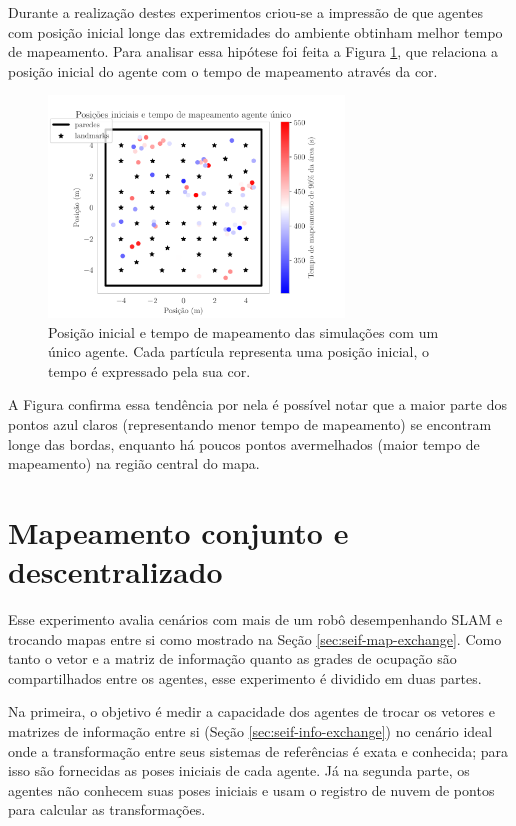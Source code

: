 Durante a realização destes experimentos criou-se a impressão de que agentes com posição inicial longe das extremidades do ambiente obtinham 
melhor tempo de mapeamento. Para analisar essa hipótese foi feita a Figura \ref{fig:single-agent-initial-pos-and-time}, que relaciona a 
posição inicial do agente com o tempo de mapeamento através da cor. 

\begin{figure}
  \centering
  \includegraphics[width=0.7\textwidth]{figs/single-agent/initial_positions_and_time_single_agent.pdf}
  \caption[Posição inicial e tempo de mapeamento das simulações com um único agente.]{Posição inicial e tempo de mapeamento das simulações com um único agente. Cada partícula representa uma posição inicial, o tempo é expressado pela sua cor.}
  \label{fig:single-agent-initial-pos-and-time}
\end{figure}
A Figura confirma essa tendência por nela é possível notar que a maior parte dos pontos azul claros (representando menor tempo de mapeamento) se 
encontram longe das bordas, enquanto há poucos pontos avermelhados (maior tempo de mapeamento) na região central do mapa.

\section{Mapeamento conjunto e descentralizado}
Esse experimento avalia cenários com mais de um robô desempenhando SLAM 
e trocando mapas entre si como mostrado na Seção \ref{sec:seif-map-exchange}. Como tanto o vetor e a matriz de informação 
quanto as grades de ocupação são compartilhados entre os agentes, esse 
experimento é dividido em duas partes.

Na primeira, o objetivo é medir a 
capacidade dos agentes de trocar os vetores e matrizes de informação 
entre si (Seção \ref{sec:seif-info-exchange}) no cenário ideal onde a
transformação entre seus sistemas de referências é exata e conhecida; para isso são fornecidas as poses iniciais de cada agente. Já 
na segunda parte, os agentes não conhecem suas poses iniciais e usam o 
registro de nuvem de pontos para calcular as transformações.

